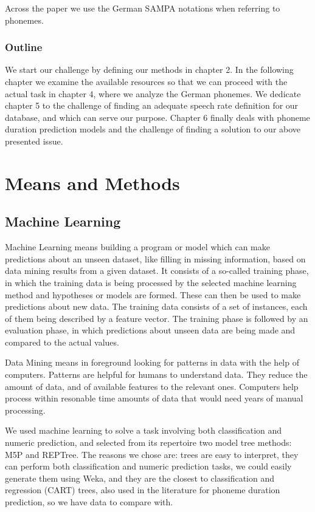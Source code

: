 \documentclass[11pt,a4paper]{scrbook}
\begin{document}
Across the paper we use the German SAMPA notations when referring to phonemes.

\subsection*{Outline}
We start our challenge by defining our methods in chapter 2. In the following chapter we examine the available resources so that we can proceed with the actual task in chapter 4, where we analyze the German phonemes. We dedicate chapter 5 to the challenge of finding an adequate speech rate definition for our database, and which can serve our purpose. Chapter 6 finally deals with phoneme duration prediction models and the challenge of finding a solution to our above presented issue.

\chapter{Means and Methods}

\section{Machine Learning}
Machine Learning means building a program or model which can make predictions about an unseen dataset, like filling in missing information, based on data mining results from a given dataset. It consists of a so-called training phase, in which the training data is being processed by the selected machine learning method and hypotheses or models are formed. These can then be used to make predictions about new data. The training data consists of a set of instances, each of them being described by a feature vector. The training phase is followed by an evaluation phase, in which predictions about unseen data are being made and compared to the actual values. 

Data Mining means in foreground looking for patterns in data with the help of computers. Patterns are helpful for humans to understand data. They reduce the amount of data, and of available features to the relevant ones. Computers help process within resonable time amounts of data that would need years of manual processing.

We used machine learning to solve a task involving both classification and numeric prediction, and selected from its repertoire two model tree methods: M5P and REPTree. The reasons we chose are: trees are easy to interpret, they can perform both classification and numeric prediction tasks, we could easily generate them using Weka, and they are the closest to classification and regression (CART) trees, also used in the literature \cite{Brinckmann_2003} for phoneme duration prediction, so we have data to compare with.
\end{document}
